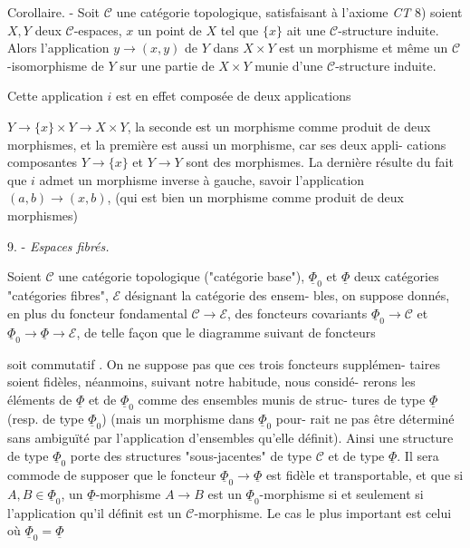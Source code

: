 Corollaire. - Soit $\mathcal{C}$ une catégorie topologique, satisfaisant à l'axiome \emph{CT} 8) soient $X, Y$ deux $\mathcal{C}$-espaces, $x$ un point de $X$ tel que $\{x\}$ ait une $\mathcal{C}$-structure induite. Alors l'application $y \to (x, y)$ de $Y$ dans $X \times Y$ est un morphisme et même un $\mathcal{C}$-isomorphisme de $Y$ sur une partie de $X \times Y$ munie d'une $\mathcal{C}$-structure induite.

Cette application $i$ est en effet composée de deux applications

\newpage



$Y \to \{x\} \times Y \to X \times Y$, la seconde est un morphisme comme produit de deux
morphismes, et la première est aussi un morphisme, car ses deux appli-
cations composantes $Y \to \{x\}$ et $Y \to Y$ sont des morphismes. La dernière
résulte du fait que $i$ admet un morphisme inverse à gauche, savoir
l'application $(a,b) \to (x,b)$, (qui est bien un morphisme comme produit
de deux morphismes)

9. - \emph{Espaces fibrés.}

Soient $\mathcal{C}$ une catégorie topologique ("catégorie base"), $\underline{\Phi}_0$ et $\underline{\Phi}$ deux
catégories "catégories fibres", $\mathcal{E}$ désignant la catégorie des ensem-
bles, on suppose donnés, en plus du foncteur fondamental $\mathcal{C} \to \mathcal{E}$, des
foncteurs covariants $\underline{\Phi}_0 \to \mathcal{C}$ et $\underline{\Phi}_0 \to \underline{\Phi} \to \mathcal{E}$, de telle façon que
le diagramme suivant de foncteurs
soit commutatif . On ne suppose pas que ces trois foncteurs supplémen-
taires soient fidèles, néanmoins, suivant notre habitude, nous considé-
rerons les éléments de $\underline{\Phi}$ et de $\underline{\Phi}_0$ comme des ensembles munis de struc-
tures de type $\underline{\Phi}$ (resp. de type $\underline{\Phi}_0$) (mais un morphisme dans $\underline{\Phi}_0$ pour-
rait ne pas être déterminé sans ambiguïté par l'application d'ensembles
qu'elle définit). Ainsi une structure de type $\underline{\Phi}_0$ porte des structures
"sous-jacentes" de type $\mathcal{C}$ et de type $\underline{\Phi}$. Il sera commode de supposer
que le foncteur
$\underline{\Phi}_0 \to \underline{\Phi}$
est fidèle et transportable, et que si $A,B \in \underline{\Phi}_0$, un $\underline{\Phi}$-morphisme $A \to B$
est un $\underline{\Phi}_0$-morphisme si et seulement si l'application qu'il définit est
un $\mathcal{C}$-morphisme. Le cas le plus important est celui où $\underline{\Phi}_0 = \underline{\Phi}$

